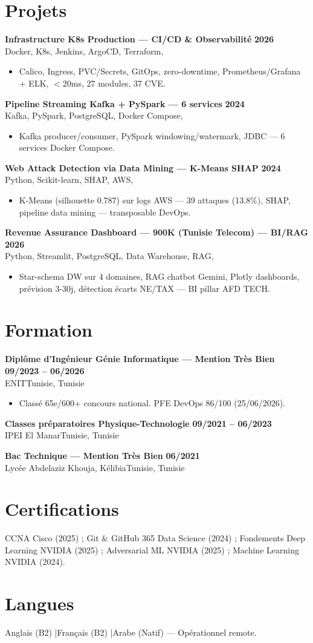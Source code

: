 \documentclass[a4paper,10pt]{article}
\newcommand{\cventry}[4]{\textbf{#1} \hfill \textbf{#4}\\[1pt]#2{\ifx\relax#3\relax\else, #3\fi}\par\vspace{2pt}}
\begin{document}
\section{Projets}
\cventry{Infrastructure K8s Production — CI/CD \& Observabilité}{Docker, K8s, Jenkins, ArgoCD, Terraform}{}{2026}
\begin{itemize}
  \item Calico, Ingress, PVC/Secrets, GitOps, zero-downtime, Prometheus/Grafana + ELK, $<$20ms, 27 modules, 37 CVE.
\end{itemize}
\cventry{Pipeline Streaming Kafka + PySpark — 6 services}{Kafka, PySpark, PostgreSQL, Docker Compose}{}{2024}
\begin{itemize}
  \item Kafka producer/consumer, PySpark windowing/watermark, JDBC — 6 services Docker Compose.
\end{itemize}
\cventry{Web Attack Detection via Data Mining — K-Means SHAP}{Python, Scikit-learn, SHAP, AWS}{}{2024}
\begin{itemize}
  \item K-Means (silhouette 0.787) sur logs AWS — 39 attaques (13.8\%), SHAP, pipeline data mining — transposable DevOps.
\end{itemize}
\cventry{Revenue Assurance Dashboard — 900K (Tunisie Telecom) — BI/RAG}{Python, Streamlit, PostgreSQL, Data Warehouse, RAG}{}{2026}
\begin{itemize}
  \item Star-schema DW sur 4 domaines, RAG chatbot Gemini, Plotly dashboards, prévision 3-30j, détection écarts NE/TAX — BI pillar AFD TECH.
\end{itemize}

\section{Formation}
\cventry{Diplôme d'Ingénieur Génie Informatique — Mention Très Bien}{ENIT}{Tunisie}{09/2023 -- 06/2026}
\begin{itemize}
  \item Classé 65e/600+ concours national. PFE DevOps 86/100 (25/06/2026).
\end{itemize}
\cventry{Classes préparatoires Physique-Technologie}{IPEI El Manar}{Tunisie}{09/2021 -- 06/2023}
\cventry{Bac Technique — Mention Très Bien}{Lycée Abdelaziz Khouja, Kélibia}{Tunisie}{06/2021}

\section{Certifications}
CCNA Cisco (2025) ; Git \& GitHub 365 Data Science (2024) ; Fondements Deep Learning NVIDIA (2025) ; Adversarial ML NVIDIA (2025) ; Machine Learning NVIDIA (2024).

\section{Langues}
Anglais (B2) \quad|\quad Français (B2) \quad|\quad Arabe (Natif) — Opérationnel remote.
\end{document}
